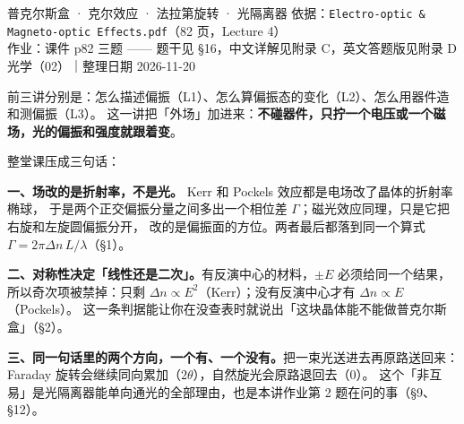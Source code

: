 \documentclass[11pt]{ctexart}
\let\hdrorig\hdr
\renewcommand{\hdr}[2]{\needspace{8\baselineskip}\hdrorig{#1}{#2}}
\begin{document}
{普克尔斯盒 · 克尔效应 · 法拉第旋转 · 光隔离器}
{依据：\texttt{Electro-optic \& Magneto-optic Effects.pdf}（82 页，Lecture 4）\\
作业：课件 p82 三题 —— 题干见 §16，中文详解见附录 C，英文答题版见附录 D\\
光学（02）｜整理日期 2026-11-20}



前三讲分别是：怎么描述偏振（L1）、怎么算偏振态的变化（L2）、怎么用器件造和测偏振（L3）。
这一讲把「外场」加进来：\textbf{不碰器件，只拧一个电压或一个磁场，光的偏振和强度就跟着变}。

整堂课压成三句话：

\textbf{一、场改的是折射率，不是光。} Kerr 和 Pockels 效应都是电场改了晶体的折射率椭球，
于是两个正交偏振分量之间多出一个相位差 $\Gamma$；磁光效应同理，只是它把右旋和左旋圆偏振分开，
改的是偏振面的方位。两者最后都落到同一个算式 $\Gamma=2\pi\Delta n\,L/\lambda$（§1）。

\textbf{二、对称性决定「线性还是二次」。}有反演中心的材料，$\pm E$ 必须给同一个结果，
所以奇次项被禁掉：只剩 $\Delta n\propto E^2$（Kerr）；没有反演中心才有 $\Delta n\propto E$（Pockels）。
这一条判据能让你在没查表时就说出「这块晶体能不能做普克尔斯盒」（§2）。

\textbf{三、同一句话里的两个方向，一个有、一个没有。}把一束光送进去再原路送回来：
Faraday 旋转会继续同向累加（$2\theta$），自然旋光会原路退回去（$0$）。
这个「非互易」是光隔离器能单向通光的全部理由，也是本讲作业第 2 题在问的事（§9、§12）。
\end{document}

